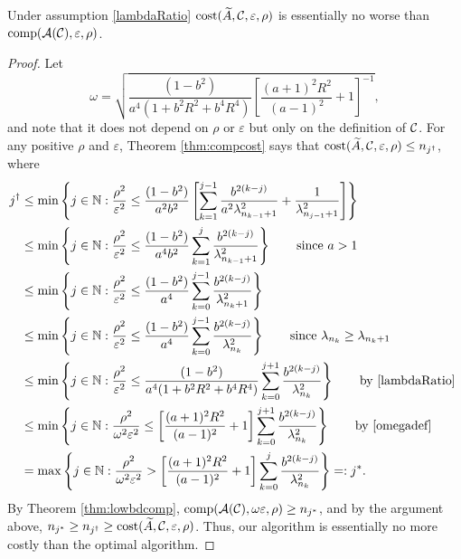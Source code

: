 \documentclass[graybox,footinfo]{svmult}
\begin{document}
\begin{theorem}
\label{thm:CostNoWorse}
Under assumption \eqref{lambdaRatio} $\textup{cost}(\widetilde{A},{\mathcal{C}}, \varepsilon,\rho)$ is essentially no worse than $\textup{comp}({\mathcal{A}}({\mathcal{C}}),\varepsilon,\rho)$. 
\end{theorem}
\begin{proof}
Let  
\begin{equation} \label{omegadef}
    \omega = \sqrt{\frac{(1 - b^2)}{a^4(1 + b^2R^2 + b^4R^4)}\left[\frac{(a+1)^{2} R^2 }{(a-1)^2} + 1\right]^{-1}},
\end{equation}
and note that it does not depend on $\rho$ or $\varepsilon$ but only on the definition of ${\mathcal{C}}$. 
For any positive $\rho$ and $\varepsilon$, Theorem \ref{thm:compcost} says that $\textup{cost}(\widetilde{A},{\mathcal{C}},\varepsilon,\rho) \le n_{j^\dagger}$, where 
\begin{align*} 
j^\dagger &\le \min \left \{j \in {\mathbb{N}} : \frac{\rho^2}{\varepsilon^2} \le \frac{(1 - b^2)}{a^2b^2} \left[ \sum_{k=1}^{j-1} \frac{b^{2(k-j)}}{a^2\lambda_{n_{k-1}+1}^2} + \frac{1}{\lambda_{n_{j-1}+1}^2}\right]   \right\} \\
&\le \min \left \{j \in {\mathbb{N}} : \frac{\rho^2}{\varepsilon^2} \le \frac{(1 - b^2)}{a^4b^2} \sum_{k=1}^{j} \frac{b^{2(k-j)}}{\lambda_{n_{k-1}+1}^2} \right\} \qquad \text{since } a > 1\\
&\le \min \left \{j \in {\mathbb{N}} : \frac{\rho^2}{\varepsilon^2} \le \frac{(1 - b^2)}{a^4} \sum_{k=0}^{j-1} \frac{b^{2(k-j)}}{\lambda_{n_{k}+1}^2} \right\} \\
&\le \min \left \{j \in {\mathbb{N}} : \frac{\rho^2}{\varepsilon^2} \le \frac{(1 - b^2)}{a^4} \sum_{k=0}^{j-1} \frac{b^{2(k-j)}}{\lambda_{n_{k}}^2} \right\} \qquad \text{since } \lambda_{n_k} \ge \lambda_{n_k+1}\\
&\le \min \left \{j \in {\mathbb{N}} : \frac{\rho^2}{\varepsilon^2} \le \frac{(1 - b^2)}{a^4(1 + b^2R^2 + b^4R^4)} \sum_{k=0}^{j+1} \frac{b^{2(k-j)}}{\lambda_{n_{k}}^2} \right\} \qquad \text{by \eqref{lambdaRatio} } \\
&\le \min \left \{j \in {\mathbb{N}} : \frac{\rho^2}{\omega^2 \varepsilon^2} \le \left[\frac{(a+1)^{2} R^2 }{(a-1)^2} + 1\right] \sum_{k=0}^{j+1} \frac{b^{2(k-j)}}{\lambda_{n_{k}}^2} \right\} \qquad \text{by \eqref{omegadef} } \\
&= \max \left \{j \in {\mathbb{N}} : \frac{\rho^2}{\omega^2 \varepsilon^2} > \left[\frac{(a+1)^{2} R^2 }{(a-1)^2} + 1\right] \sum_{k=0}^{j} \frac{b^{2(k-j)}}{\lambda_{n_{k}}^2} \right\} =:j^*.
\end{align*}
By Theorem \ref{thm:lowbdcomp}, $\textup{comp}({\mathcal{A}}({\mathcal{C}}),\omega\varepsilon,\rho) \ge n_{j^*}$, and by the argument above, $n_{j^*} \ge n_{j^\dagger} \ge \textup{cost}(\widetilde{A},{\mathcal{C}},\varepsilon,\rho)$.  Thus, our algorithm is essentially no more costly than the optimal algorithm.
\end{proof}
\end{document}

